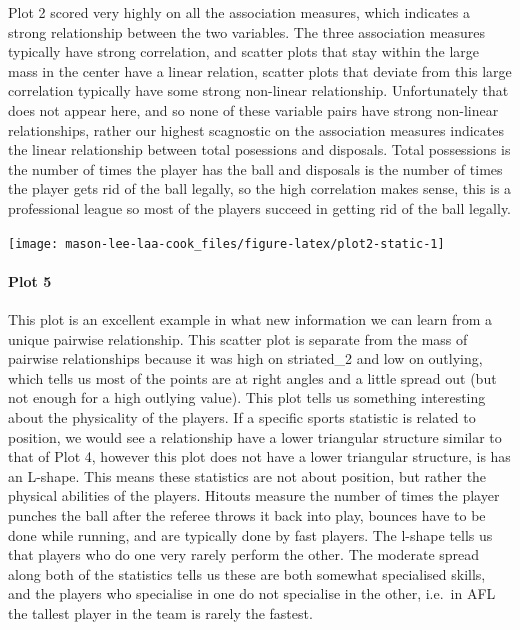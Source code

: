 Plot 2 scored very highly on all the association measures, which
indicates a strong relationship between the two variables. The three
association measures typically have strong correlation, and scatter
plots that stay within the large mass in the center have a linear
relation, scatter plots that deviate from this large correlation
typically have some strong non-linear relationship. Unfortunately that
does not appear here, and so none of these variable pairs have strong
non-linear relationships, rather our highest scagnostic on the
association measures indicates the linear relationship between total
posessions and disposals. Total possessions is the number of times the
player has the ball and disposals is the number of times the player gets
rid of the ball legally, so the high correlation makes sense, this is a
professional league so most of the players succeed in getting rid of the
ball legally.

\begin{Schunk}


\begin{center}\texttt{[image: mason-lee-laa-cook\_files/figure-latex/plot2-static-1]} \end{center}

\end{Schunk}

\hypertarget{plot-5}{%
\paragraph{Plot 5}\label{plot-5}}

This plot is an excellent example in what new information we can learn
from a unique pairwise relationship. This scatter plot is separate from
the mass of pairwise relationships because it was high on striated\_2
and low on outlying, which tells us most of the points are at right
angles and a little spread out (but not enough for a high outlying
value). This plot tells us something interesting about the physicality
of the players. If a specific sports statistic is related to position,
we would see a relationship have a lower triangular structure similar to
that of Plot 4, however this plot does not have a lower triangular
structure, is has an L-shape. This means these statistics are not about
position, but rather the physical abilities of the players. Hitouts
measure the number of times the player punches the ball after the
referee throws it back into play, bounces have to be done while running,
and are typically done by fast players. The l-shape tells us that
players who do one very rarely perform the other. The moderate spread
along both of the statistics tells us these are both somewhat
specialised skills, and the players who specialise in one do not
specialise in the other, i.e.~in AFL the tallest player in the team is
rarely the fastest.

